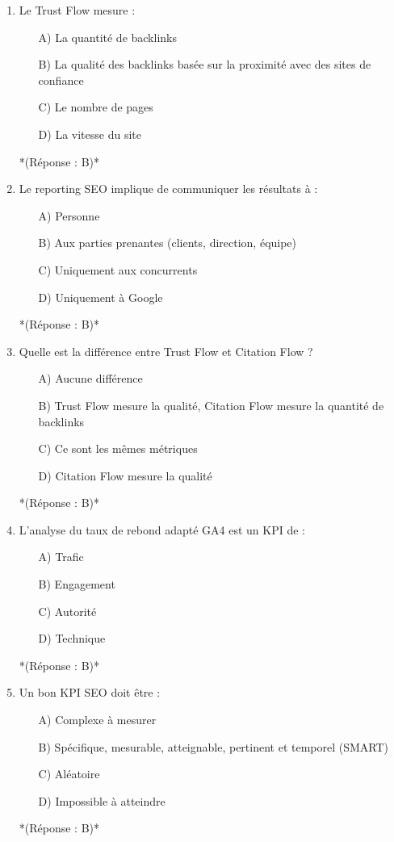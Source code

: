 \documentclass[12pt,a4paper,twoside]{report}
\begin{document}
\begin{enumerate}
    \item Le Trust Flow mesure :
    \begin{itemize}
        \item[A)] La quantité de backlinks
        \item[B)] La qualité des backlinks basée sur la proximité avec des sites de confiance
        \item[C)] Le nombre de pages
        \item[D)] La vitesse du site
    \end{itemize}
    *(Réponse : B)*

    \item Le reporting SEO implique de communiquer les résultats à :
    \begin{itemize}
        \item[A)] Personne
        \item[B)] Aux parties prenantes (clients, direction, équipe)
        \item[C)] Uniquement aux concurrents
        \item[D)] Uniquement à Google
    \end{itemize}
    *(Réponse : B)*

    \item Quelle est la différence entre Trust Flow et Citation Flow ?
    \begin{itemize}
        \item[A)] Aucune différence
        \item[B)] Trust Flow mesure la qualité, Citation Flow mesure la quantité de backlinks
        \item[C)] Ce sont les mêmes métriques
        \item[D)] Citation Flow mesure la qualité
    \end{itemize}
    *(Réponse : B)*

    \item L'analyse du taux de rebond adapté GA4 est un KPI de :
    \begin{itemize}
        \item[A)] Trafic
        \item[B)] Engagement
        \item[C)] Autorité
        \item[D)] Technique
    \end{itemize}
    *(Réponse : B)*

    \item Un bon KPI SEO doit être :
    \begin{itemize}
        \item[A)] Complexe à mesurer
        \item[B)] Spécifique, mesurable, atteignable, pertinent et temporel (SMART)
        \item[C)] Aléatoire
        \item[D)] Impossible à atteindre
    \end{itemize}
    *(Réponse : B)*


\end{enumerate}
\end{document}
